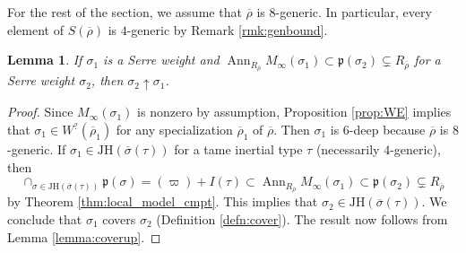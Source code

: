 \documentclass[oneside,a4paper,english, 11pt]{amsart}
\theoremstyle{plain}
\theoremstyle{plain}
\theoremstyle{plain}
\newtheorem{lemma}[thm]{Lemma}
\theoremstyle{plain}
\theoremstyle{plain}
\theoremstyle{plain}
\theoremstyle{definition}
\theoremstyle{definition}
\theoremstyle{definition}
\theoremstyle{remark}
\numberwithin{equation}{section}
\newcommand{\JH}{\mathrm{JH}}
\newcommand{\rhobar}{\overline{\rho}}
\newcommand{\ovl}[1]{\overline{#1}}
\DeclareMathOperator{\Ann}{Ann}
\begin{document}
For the rest of the section, we assume that $\rhobar$ is $8$-generic. In particular, every element of $S(\rhobar)$ is $4$-generic by Remark \ref{rmk:genbound}. 

\begin{lemma}\label{lemma:supportcyclebound}
If $\sigma_1$ is a Serre weight and $\Ann_{R_{\rhobar}} M_\infty(\sigma_1) \subset \mathfrak{p}(\sigma_2) \subsetneq R_{\rhobar}$ for a Serre weight $\sigma_2$, then $\sigma_2 \uparrow \sigma_1$. 
\end{lemma}
\begin{proof}
Since $M_\infty(\sigma_1)$ is nonzero by assumption, Proposition \ref{prop:WE} implies that $\sigma_1 \in W^?(\rhobar_1)$ for any specialization $\rhobar_1$ of $\rhobar$. 
Then $\sigma_1$ is $6$-deep because $\rhobar$ is $8$-generic. 
%
If $\sigma_1 \in \JH(\ovl{\sigma}(\tau))$ for a tame inertial type $\tau$ (necessarily $4$-generic), then 
\[
\cap_{\sigma \in \JH(\ovl{\sigma}(\tau))} \mathfrak{p}(\sigma) = (\varpi) + I(\tau) \subset \Ann_{R_{\rhobar}} M_\infty(\sigma_1) \subset \mathfrak{p}(\sigma_2) \subsetneq R_{\rhobar}
\]
by Theorem \ref{thm:local_model_cmpt}.
This implies that $\sigma_2 \in \JH(\ovl{\sigma}(\tau))$. 
We conclude that $\sigma_1$ covers $\sigma_2$ (Definition \ref{defn:cover}). 
The result now follows from Lemma \ref{lemma:coverup}. 
\end{proof}
\end{document}
